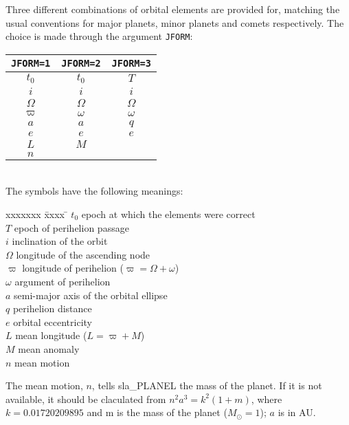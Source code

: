 \documentclass[11pt,twoside]{article}
\begin{document}
Three different combinations of orbital elements are
provided for, matching the usual conventions
for major planets, minor planets and
comets respectively.  The choice is made through the
argument {\tt JFORM}:\\

\hspace{4em}
\begin{tabular}{|c|c|c|} \hline
{\tt JFORM=1} & {\tt JFORM=2} & {\tt JFORM=3} \\
\hline \hline
$t_0$ & $t_0$ & $T$ \\
\hline
$i$ & $i$ & $i$ \\
\hline
$\Omega$ & $\Omega$ & $\Omega$ \\
\hline
$\varpi$ & $\omega$ & $\omega$ \\
\hline
$a$ & $a$ & $q$ \\
\hline
$e$ & $e$ & $e$ \\
\hline
$L$ & $M$ & \\
\hline
$n$ & & \\
\hline
\end{tabular}\\[5ex]
The symbols have the following meanings:
\begin{tabbing}
xxxxxxx \= xxxx \= \kill
\> $t_0$ \> epoch at which the elements were correct \\
\> $T$ \> epoch of perihelion passage \\
\> $i$ \> inclination of the orbit \\
\> $\Omega$ \> longitude of the ascending node \\
\> $\varpi$ \> longitude of perihelion ($\varpi = \Omega + \omega$) \\
\> $\omega$ \> argument of perihelion \\
\> $a$ \> semi-major axis of the orbital ellipse \\
\> $q$ \> perihelion distance \\
\> $e$ \> orbital eccentricity \\
\> $L$ \> mean longitude ($L = \varpi + M$) \\
\> $M$ \> mean anomaly \\
\> $n$ \> mean motion \\
\end{tabbing}

The mean motion, $n$, tells sla\_PLANEL the mass of the planet.
If it is not available, it should be claculated
from $n^2 a^3 = k^2 (1+m)$, where $k = 0.01720209895$ and
m is the mass of the planet ($M_\odot = 1$); $a$ is in AU.
\end{document}
